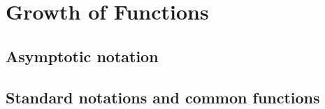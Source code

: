 \chapter{Growth of Functions}
\section{Asymptotic notation}
\subsection{}

\setcounter{subsection}{2}
\subsection{}

\subsection{}

\setcounter{subsection}{5}
\subsection{}

\section{Standard notations and common functions}
\subsection{}

\subsection{}

\setcounter{subsection}{5}
\subsection{}

\subsection{}

